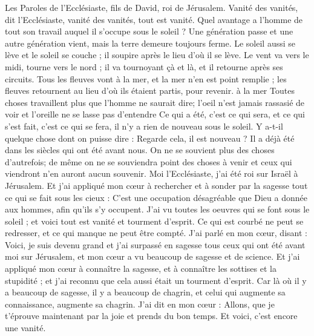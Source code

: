 \begin{multicols}{2}
\VerseOne{}Les Paroles de l'Ecclésiaste, fils de David, roi de Jérusalem.
Vanité des vanités, dit l'Ecclésiaste, vanité des vanités, tout est vanité.
Quel avantage a l'homme de tout son travail auquel il s'occupe sous le soleil ?
Une génération passe et une autre génération vient, mais la terre demeure toujours ferme.
Le soleil aussi se lève et le soleil se couche ; il soupire après le lieu d'où il se lève.
Le vent va vers le midi, tourne vers le nord ; il va tournoyant çà et là, et il retourne après ses circuits.
Tous les fleuves vont à la mer, et la mer n'en est point remplie ; les fleuves retournent au lieu d'où ils étaient partis, pour revenir. à la mer 
Toutes choses travaillent plus que l'homme ne saurait dire; l'oeil n'est jamais rassasié de voir et l'oreille ne se lasse pas d'entendre 
Ce qui a été, c'est ce qui sera, et ce qui s'est fait, c'est ce qui se fera, il n'y a rien de nouveau sous le soleil.
Y a-t-il quelque chose dont on puisse dire : Regarde cela, il est nouveau ? Il a déjà été dans les siècles qui ont été avant nous.
On ne se souvient plus des choses d'autrefois; de même on ne se souviendra point des choses à venir et ceux qui viendront n'en auront aucun souvenir. 
Moi l'Ecclésiaste, j'ai été roi sur Israël à Jérusalem.
Et j'ai appliqué mon cœur à rechercher et à sonder par la sagesse tout ce qui se fait sous les cieux : C'est une occupation désagréable que Dieu a donnée aux hommes, afin qu'ils s'y occupent.
J'ai vu toutes les oeuvres qui se font sous le soleil ; et voici tout est vanité et tourment d'esprit.
Ce qui est courbé ne peut se redresser, et ce qui manque ne peut être compté.
J'ai parlé en mon cœur, disant : Voici, je suis devenu grand et j'ai surpassé en sagesse tous ceux qui ont été avant moi sur Jérusalem, et mon cœur a vu beaucoup de sagesse et de science.
Et j'ai appliqué mon cœur à connaître la sagesse, et à connaître les sottises et la stupidité ; et j'ai reconnu que cela aussi était un tourment d'esprit.
Car là où il y a beaucoup de sagesse, il y a beaucoup de chagrin, et celui qui augmente sa connaissance, augmente sa chagrin.
\VerseOne{}J'ai dit en mon cœur : Allons, que je t'éprouve maintenant par la joie et prends du bon temps. Et voici, c'est encore une vanité.

\end{multicols}
